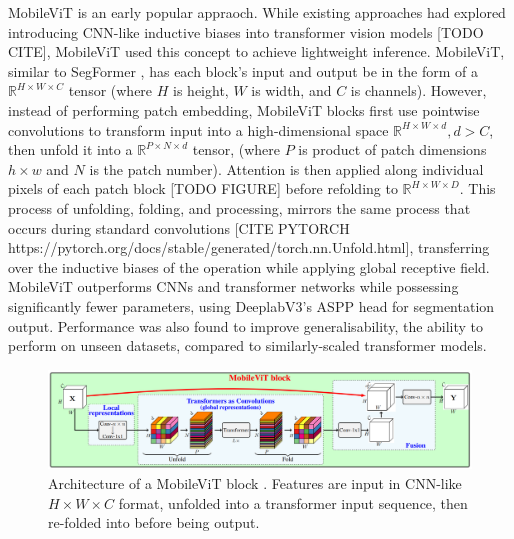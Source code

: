 \documentclass[a4paper,12pt]{report}
\begin{document}
MobileViT \cite{mehta_mobilevit_2022} is an early popular appraoch. While existing approaches had explored introducing CNN-like inductive biases into transformer vision models [TODO CITE], MobileViT \cite{mehta_mobilevit_2022} used this concept to achieve lightweight inference. MobileViT, similar to SegFormer \cite{xie_segformer_2021}, has each block's input and output be in the form of a $\mathbb{R}^{H \times W \times C}$ tensor (where $H$ is height, $W$ is width, and $C$ is channels). However, instead of performing patch embedding, MobileViT blocks first use pointwise convolutions to transform input into a high-dimensional space $\mathbb{R}^{H \times W \times d}, d > C$, then unfold it into a $\mathbb{R}^{P \times N \times d}$ tensor, (where $P$ is product of patch dimensions $h \times w$ and $N$ is the patch number). Attention is then applied along individual pixels of each patch block [TODO FIGURE] before refolding to $\mathbb{R}^{H \times W \times D}$. This process of unfolding, folding, and processing, mirrors the same process that occurs during standard convolutions [CITE PYTORCH https://pytorch.org/docs/stable/generated/torch.nn.Unfold.html], transferring over the inductive biases of the operation while applying global receptive field. MobileViT outperforms CNNs and transformer networks while possessing significantly fewer parameters, using DeeplabV3's ASPP head \cite{chen_rethinking_2017} for segmentation output. Performance was also found to improve generalisability, the ability to perform on unseen datasets, compared to similarly-scaled transformer models.

\begin{figure}[ht!]
    \centering
    \includegraphics[width=\textwidth]{res/mobilevit-block.png}
    \caption{Architecture of a MobileViT block \cite{mehta_mobilevit_2022}. Features are input in CNN-like $H \times W \times C$ format, unfolded into a transformer input sequence, then re-folded into before being output.}
    \label{fig:mobilevit_block}
\end{figure}
\end{document}
